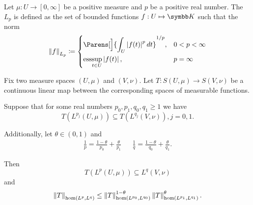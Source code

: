 \begin{definition}\label{def:lebesgue_space}\cite[6]{Bergh1976}
  Let \( \mu: U \to [0, \infty] \) be a positive measure and \( p \) be a positive real number. The  \( L_p \) is defined as the set of bounded functions \( f: U \mapsto \BK \) such that the norm
  \begin{equation*}
    \Norm{f}_{L_p} \coloneqq \begin{dcases}
      \Parens[\Big]{\int_U \Abs{f(t)}^p dt}^{1/p}, &0 < p < \infty \\
      \Ess\sup_{t \in U} \Abs{f(t)} , &p = \infty
    \end{dcases}
  \end{equation*}
\end{definition}

\begin{theorem}\label{thm:riesz_thorin}
  Fix two measure spaces \( (U, \mu) \) and \( (V, \nu) \). Let \( T: S(U, \mu) \to S(V, \nu) \) be a continuous linear map between the corresponding spaces of measurable functions.

  Suppose that for some real numbers \( p_0, p_1, q_0, q_1 \geq 1 \) we have
  \begin{equation*}
    T(L^{p_j}(U, \mu)) \subseteq T(L^{q_j}(V, \nu)), j = 0, 1.
  \end{equation*}

  Additionally, let \( \theta \in (0, 1) \) and
  \begin{align*}
    \frac 1 p = \frac {1 - \theta} {p_0} + \frac {\theta} {p_1}
    &&
    \frac 1 q = \frac {1 - \theta} {q_0} + \frac {\theta} {q_1}.
  \end{align*}

  Then
  \begin{equation*}
    T(L^p(U, \mu)) \subseteq L^q(V, \nu)
  \end{equation*}
  and
  \begin{equation*}
    \left\Vert T \right\Vert_{\operatorname{hom}(L^p, L^q)} \leq \left\Vert T \right\Vert_{\operatorname{hom}(L^{p_0}, L^{q_0})}^{1 - \theta} \left\Vert T \right\Vert_{\operatorname{hom}(L^{p_1}, L^{q_1})}^\theta.
  \end{equation*}
\end{theorem}

